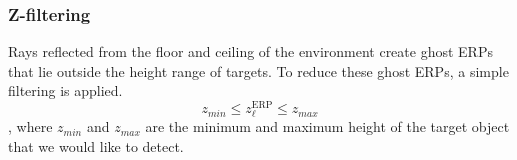 \subsubsection{Z-filtering}
\label{subsubsec:z-filtering}

Rays reflected from the floor and ceiling of the environment create ghost ERPs that lie outside the height range of targets.
To reduce these ghost ERPs, a simple filtering is applied.
\begin{equation}
    z_{min} \le z_\ell^{\mathrm{ERP}} \le z_{max}
\end{equation},
where $z_{min}$ and $z_{max}$ are the minimum and maximum height of the target object that we would like to detect.